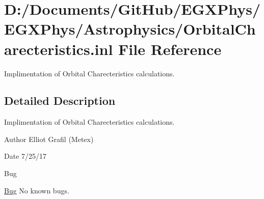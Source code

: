 \hypertarget{_orbital_charecteristics_8inl}{}\section{D\+:/\+Documents/\+Git\+Hub/\+E\+G\+X\+Phys/\+E\+G\+X\+Phys/\+Astrophysics/\+Orbital\+Charecteristics.inl File Reference}
\label{_orbital_charecteristics_8inl}


Implimentation of Orbital Charecteristics calculations.  




\subsection{Detailed Description}
Implimentation of Orbital Charecteristics calculations. 

\begin{DoxyAuthor}{Author}
Elliot Grafil (Metex) 
\end{DoxyAuthor}
\begin{DoxyDate}{Date}
7/25/17 
\end{DoxyDate}
\begin{DoxyRefDesc}{Bug}
\item[\hyperlink{bug__bug000012}{Bug}]No known bugs. \end{DoxyRefDesc}
